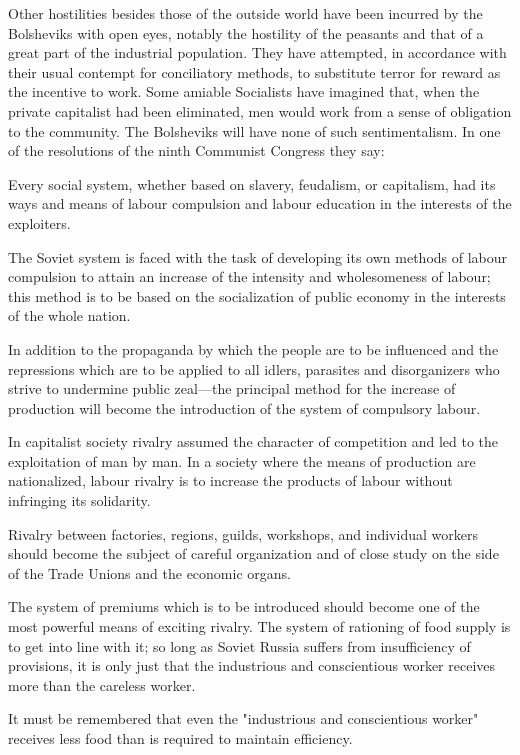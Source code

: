 Other hostilities besides those of the outside world have been incurred by the Bolsheviks with open eyes, notably the hostility of the peasants and that of a great part of the industrial population. They have attempted, in accordance with their usual contempt for conciliatory methods, to substitute terror for reward as the incentive to work. Some amiable Socialists have imagined that, when the private capitalist had been eliminated, men would work from a sense of obligation to the community. The Bolsheviks will have none of such sentimentalism. In one of the resolutions of the ninth Communist Congress they say:
\begin{displayquote}
Every social system, whether based on slavery, feudalism, or capitalism, had its ways and means of labour compulsion and labour education in the interests of the exploiters.

The Soviet system is faced with the task of developing its own methods of labour compulsion to attain an increase of the intensity and wholesomeness of labour; this method is to be based on the socialization of public economy in the interests of the whole nation.

In addition to the propaganda by which the people are to be influenced and the repressions which are to be applied to all idlers, parasites and disorganizers who strive to undermine public zeal---the principal method for the increase of production will become the introduction of the system of compulsory labour.

In capitalist society rivalry assumed the character of competition and led to the exploitation of man by man. In a society where the means of production are nationalized, labour rivalry is to increase the products of labour without infringing its solidarity.

Rivalry between factories, regions, guilds, workshops, and individual workers should become the subject of careful organization and of close study on the side of the Trade Unions and the economic organs.

The system of premiums which is to be introduced should become one of the most powerful means of exciting rivalry. The system of rationing of food supply is to get into line with it; so long as Soviet Russia suffers from insufficiency of provisions, it is only just that the industrious and conscientious worker receives more than the careless worker.
\end{displayquote}
It must be remembered that even the "industrious and conscientious worker" receives less food than is required to maintain efficiency.

